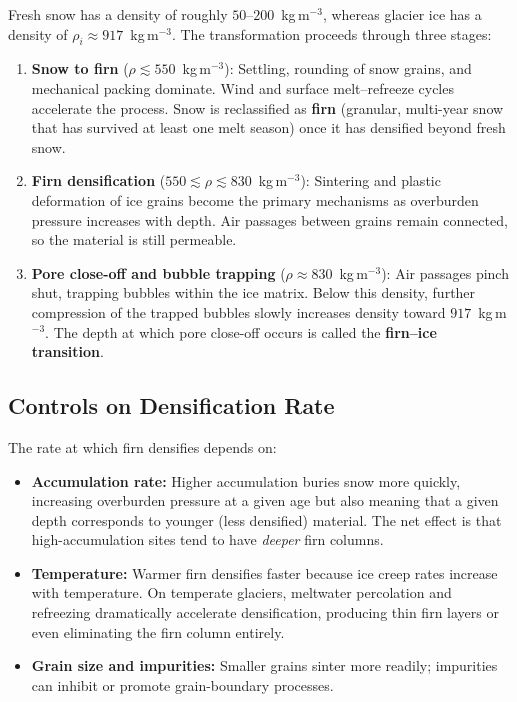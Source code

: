 \documentclass[11pt]{article}
\begin{document}
Fresh snow has a density of roughly $50$--$200$~kg\,m$^{-3}$, whereas glacier ice has a density of $\rho_i \approx 917$~kg\,m$^{-3}$.  The transformation proceeds through three stages:

\begin{enumerate}
  \item \textbf{Snow to firn} ($\rho \lesssim 550$~kg\,m$^{-3}$): Settling, rounding of snow grains, and mechanical packing dominate.  Wind and surface melt--refreeze cycles accelerate the process.  Snow is reclassified as \textbf{firn} (granular, multi-year snow that has survived at least one melt season) once it has densified beyond fresh snow.

  \item \textbf{Firn densification} ($550 \lesssim \rho \lesssim 830$~kg\,m$^{-3}$): Sintering and plastic deformation of ice grains become the primary mechanisms as overburden pressure increases with depth.  Air passages between grains remain connected, so the material is still permeable.

  \item \textbf{Pore close-off and bubble trapping} ($\rho \approx 830$~kg\,m$^{-3}$): Air passages pinch shut, trapping bubbles within the ice matrix.  Below this density, further compression of the trapped bubbles slowly increases density toward $917$~kg\,m$^{-3}$.  The depth at which pore close-off occurs is called the \textbf{firn--ice transition}.
\end{enumerate}


\subsection{Controls on Densification Rate}

The rate at which firn densifies depends on:
\begin{itemize}
  \item \textbf{Accumulation rate:} Higher accumulation buries snow more quickly, increasing overburden pressure at a given age but also meaning that a given depth corresponds to younger (less densified) material.  The net effect is that high-accumulation sites tend to have \emph{deeper} firn columns.
  \item \textbf{Temperature:} Warmer firn densifies faster because ice creep rates increase with temperature.  On temperate glaciers, meltwater percolation and refreezing dramatically accelerate densification, producing thin firn layers or even eliminating the firn column entirely.
  \item \textbf{Grain size and impurities:} Smaller grains sinter more readily; impurities can inhibit or promote grain-boundary processes.
\end{itemize}
\end{document}
